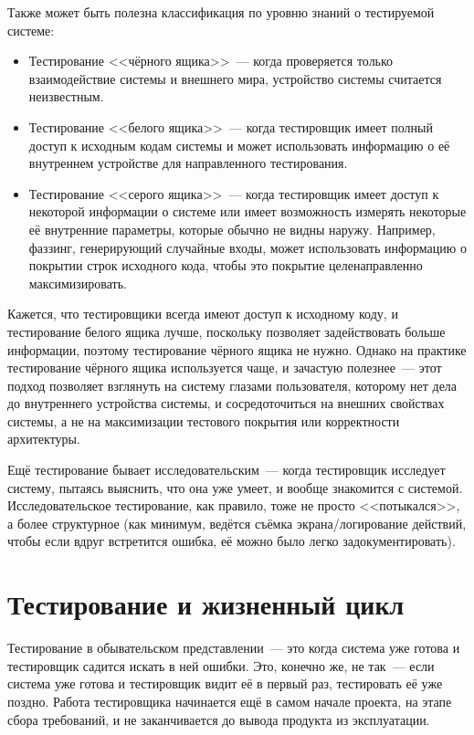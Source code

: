\documentclass{../../text-style}
\begin{document}
Также может быть полезна классификация по уровню знаний о тестируемой системе:

\begin{itemize}
    \item Тестирование <<чёрного ящика>>~--- когда проверяется только взаимодействие системы и внешнего мира, устройство системы считается неизвестным.
    \item Тестирование <<белого ящика>>~--- когда тестировщик имеет полный доступ к исходным кодам системы и может использовать информацию о её внутреннем устройстве для направленного тестирования.
    \item Тестирование <<серого ящика>>~--- когда тестировщик имеет доступ к некоторой информации о системе или имеет возможность измерять некоторые её внутренние параметры, которые обычно не видны наружу. Например, фаззинг, генерирующий случайные входы, может использовать информацию о покрытии строк исходного кода, чтобы это покрытие целенаправленно максимизировать.
\end{itemize}

Кажется, что тестировщики всегда имеют доступ к исходному коду, и тестирование белого ящика лучше, поскольку позволяет задействовать больше информации, поэтому тестирование чёрного ящика не нужно. Однако на практике тестирование чёрного ящика используется чаще, и зачастую полезнее~--- этот подход позволяет взглянуть на систему глазами пользователя, которому нет дела до внутреннего устройства системы, и сосредоточиться на внешних свойствах системы, а не на максимизации тестового покрытия или корректности архитектуры.

Ещё тестирование бывает исследовательским~--- когда тестировщик исследует систему, пытаясь выяснить, что она уже умеет, и вообще знакомится с системой. Исследовательское тестирование, как правило, тоже не просто <<потыкался>>, а более структурное (как минимум, ведётся съёмка экрана/логирование действий, чтобы если вдруг встретится ошибка, её можно было легко задокументировать).

\section{Тестирование и жизненный цикл}

Тестирование в обывательском представлении~--- это когда система уже готова и тестировщик садится искать в ней ошибки. Это, конечно же, не так~--- если система уже готова и тестировщик видит её в первый раз, тестировать её уже поздно. Работа тестировщика начинается ещё в самом начале проекта, на этапе сбора требований, и не заканчивается до вывода продукта из эксплуатации.
\end{document}
